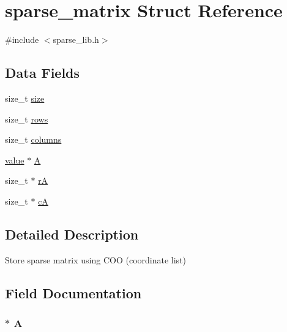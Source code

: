 \hypertarget{structsparse__matrix}{}\section{sparse\+\_\+matrix Struct Reference}
\label{structsparse__matrix}


{\ttfamily \#include $<$sparse\+\_\+lib.\+h$>$}

\subsection*{Data Fields}
\begin{DoxyCompactItemize}
\item 
size\+\_\+t \hyperlink{structsparse__matrix_a854352f53b148adc24983a58a1866d66}{size}
\item 
size\+\_\+t \hyperlink{structsparse__matrix_ad161320eba27a8b966baac47bee35c46}{rows}
\item 
size\+\_\+t \hyperlink{structsparse__matrix_a8f286185a216a03cae5eb89c39f19349}{columns}
\item 
\hyperlink{mat_lib_8h_a9068fffa81949df24c5a7a53ab72bb9b}{value} $\ast$ \hyperlink{structsparse__matrix_ac7757c8603adeff84fbd6bb51067e60c}{A}
\item 
size\+\_\+t $\ast$ \hyperlink{structsparse__matrix_aceadfed4e40af569df109589819f23ec}{r\+A}
\item 
size\+\_\+t $\ast$ \hyperlink{structsparse__matrix_aa042aece3554064ce87de3adbe34028d}{c\+A}
\end{DoxyCompactItemize}


\subsection{Detailed Description}
Store sparse matrix using C\+O\+O (coordinate list) 

\subsection{Field Documentation}
\hypertarget{structsparse__matrix_ac7757c8603adeff84fbd6bb51067e60c}{}
\subsubsection[{A}]{$\ast$ A}\label{structsparse__matrix_ac7757c8603adeff84fbd6bb51067e60c}
\hypertarget{structsparse__matrix_aa042aece3554064ce87de3adbe34028d}{}
